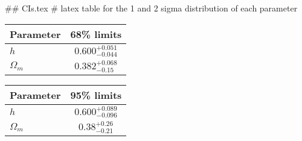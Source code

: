 ## CIs.tex
# latex table for the 1 and 2 sigma distribution of each parameter

\begin{tabular} { l  c}
 Parameter &  68\% limits\\
\hline
{\boldmath$h              $} & $0.600^{+0.051}_{-0.044}   $\\
{\boldmath$\Omega_m       $} & $0.382^{+0.068}_{-0.15}    $\\
\hline
\end{tabular}

\begin{tabular} { l  c}
 Parameter &  95\% limits\\
\hline
{\boldmath$h              $} & $0.600^{+0.089}_{-0.096}   $\\
{\boldmath$\Omega_m       $} & $0.38^{+0.26}_{-0.21}      $\\
\hline
\end{tabular}
